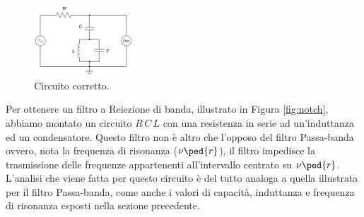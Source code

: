 \begin{figure}
  \includegraphics[width=0.33\textwidth]{s_corr.pdf}
  \caption{Circuito corretto.}
  \label{fig:corr}
\end{figure}

Per ottenere un filtro a Reiezione di banda, illustrato in Figura \ref{fig:notch}, abbiamo montato un circuito $R\,C\,L$ con una resistenza in serie ad un'induttanza ed un condensatore.
Questo filtro non è altro che l'opposo del filtro Passa-banda ovvero, nota la frequenza di risonanza ($\nu\ped{r}$), il filtro impedisce la trasmissione delle frequenze appartenenti all'intervallo centrato su $\nu\ped{r}$. L'analisi che viene fatta per questo circuito è del tutto analoga a quella illustrata per il filtro Passa-banda, come anche i valori di capacità, induttanza e frequenza di risonanza esposti nella sezione precedente.

